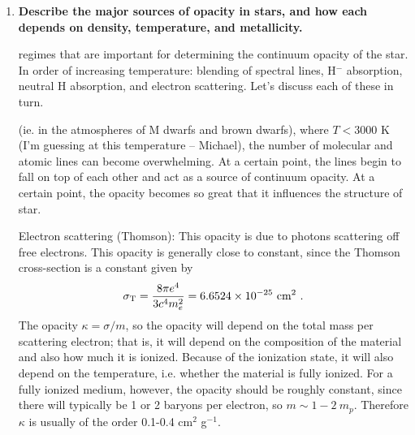 \begin{enumerate}
\item \textbf{Describe the major sources of opacity in stars, and how each depends on density,
      temperature, and metallicity.}
      
       regimes that are important for determining the
      continuum opacity of the star.  In order of increasing temperature: blending of
      spectral lines, H$^-$ absorption, neutral H absorption, and electron scattering.
      Let's discuss each of these in turn.

       (ie. in the atmospheres of M dwarfs and brown dwarfs),
      where $T<3000$ K (I'm guessing at this temperature -- Michael), the number of molecular
      and atomic lines can become overwhelming.  At a certain point, the lines begin to fall
      on top of each other and act as a source of continuum opacity.  At a certain point, the
      opacity becomes so great that it influences the structure of star.

      Electron scattering (Thomson): This opacity is due to photons scattering off free electrons. This opacity is generally close to constant, since the Thomson cross-section is a constant given by
      \begin{equation}
      \sigma_{\rm T} = \frac{8 \pi e^4}{3 c^4 m_e^2} = 6.6524\times 10^{-25}~{\rm cm}^2\,\, .
      \end{equation}
      The opacity $\kappa = \sigma / m$, so the opacity will depend on the total mass per scattering electron; that is, it will depend on the composition of the material and also how much it is ionized. Because of the ionization state, it will also depend on the temperature, i.e. whether the material is fully ionized. For a fully ionized medium, however, the opacity should be roughly constant, since there will typically be 1 or 2 baryons per electron, so $m \sim 1-2~m_p$. Therefore $\kappa$ is usually of the order 0.1-0.4 cm$^2$ g$^{-1}$.


\end{enumerate}
